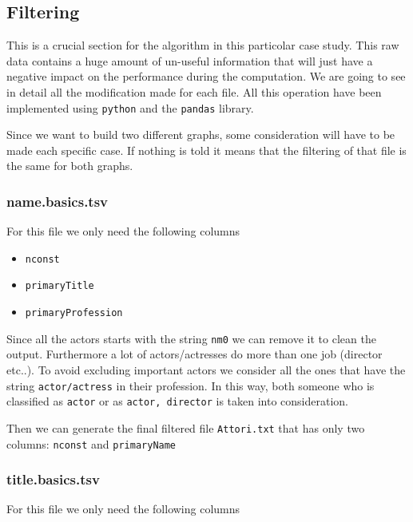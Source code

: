 \newpage
\subsection{Filtering} \label{filtering}

This is a crucial section for the algorithm in this particolar case study. This raw data contains a huge amount of un-useful information that will just have a negative impact on the performance during the computation. We are going to see in detail all the modification made for each file. All this operation have been implemented using \texttt{python} and the \texttt{pandas} library. \s

\nd Since we want to build two different graphs, some consideration will have to be made each specific case. If nothing is told it means that the filtering of that file is the same for both graphs.

\subsubsection{name.basics.tsv}

For this file we only need the following columns

\begin{itemize}
    \item \texttt{nconst}
    \item \texttt{primaryTitle}
    \item \texttt{primaryProfession}
\end{itemize}
Since all the actors starts with the string \texttt{nm0} we can remove it to clean the output. Furthermore a lot of actors/actresses do more than one job (director etc..). To avoid excluding important actors we consider all the ones that have the string \texttt{actor/actress} in their profession. In this way, both someone who is classified as \texttt{actor} or as \texttt{actor, director} is taken into consideration. \s

\noindent Then we can generate the final filtered file \texttt{Attori.txt} that has only two columns: \texttt{nconst} and \texttt{primaryName}


\subsubsection{title.basics.tsv}

For this file we only need the following columns

